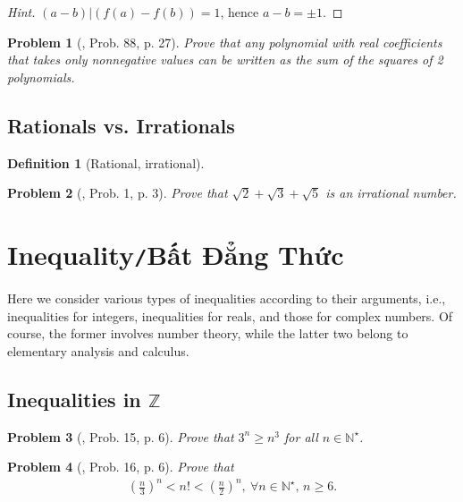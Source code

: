 \documentclass[oneside]{book}
\numberwithin{equation}{section}
\newtheorem{definition}{Definition}[section]
\newtheorem{problem}{Problem}[section]
\begin{document}
\begin{proof}[Hint]
	$(a - b)|(f(a) - f(b)) = 1$, hence $a - b = \pm 1$.
\end{proof}

\begin{problem}[\cite{Gelca_Andreescu2017}, Prob. 88, p. 27]
	Prove that any polynomial with real coefficients that takes only nonnegative values can be written as the sum of the squares of 2 polynomials.
\end{problem}

\subsection{Rationals vs. Irrationals}
\begin{definition}[Rational, irrational]
	
\end{definition}
\begin{problem}[\cite{Gelca_Andreescu2017}, Prob. 1, p. 3]
	Prove that $\sqrt{2} + \sqrt{3} + \sqrt{5}$ is an irrational number.
\end{problem}

\section{Inequality\texttt{/}Bất Đẳng Thức}
Here we consider various types of inequalities according to their arguments, i.e., inequalities for integers, inequalities for reals, and those for complex numbers. Of course, the former involves number theory, while the latter two belong to elementary analysis and calculus.

\subsection{Inequalities in $\mathbb{Z}$}

\begin{problem}[\cite{Gelca_Andreescu2017}, Prob. 15, p. 6]
	Prove that $3^n\ge n^3$ for all $n\in\mathbb{N}^\star$.
\end{problem}

\begin{problem}[\cite{Gelca_Andreescu2017}, Prob. 16, p. 6]
	Prove that
	\begin{align*}
		\left(\frac{n}{3}\right)^n < n! < \left(\frac{n}{2}\right)^n,\ \forall n\in\mathbb{N}^\star,\,n\ge 6.
	\end{align*}
\end{problem}
\end{document}
